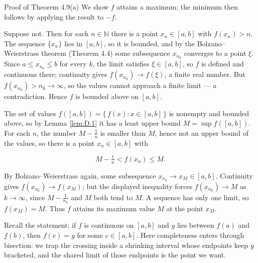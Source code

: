 \documentclass[a4paper,12pt,oneside]{memoir}
\begin{document}
\begin{envproof}{Proof of Theorem 4.9(a)}{}{}
We show \(f\) attains a maximum; the minimum then follows by applying the result to \(-f\).

 Suppose not. Then for each \(n \in \mathbb{N}\) there is a point \(x_{n} \in [a, b]\) with \(f(x_{n}) > n\). The sequence \(\{x_{n}\}\) lies in \([a, b]\), so it is bounded, and by the Bolzano–Weierstrass theorem (Theorem 4.4) some subsequence \(x_{n_{k}}\) converges to a point \(\xi\). Since \(a \le x_{n_{k}} \le b\) for every \(k\), the limit satisfies \(\xi \in [a, b]\), so \(f\) is defined and continuous there; continuity gives \(f(x_{n_{k}}) \to f(\xi)\), a finite real number. But \(f(x_{n_{k}}) > n_{k} \to \infty\), so the values cannot approach a finite limit — a contradiction. Hence \(f\) is bounded above on \([a, b]\).

 The set of values \(f([a, b]) = \{\, f(x) : x \in [a, b] \,\}\) is nonempty and bounded above, so by Lemma \ref{lem:D.1} it has a least upper bound \(M = \sup f([a, b])\). For each \(n\), the number \(M - \tfrac{1}{n}\) is smaller than \(M\), hence not an upper bound of the values, so there is a point \(x_{n} \in [a, b]\) with

\[ M - \tfrac{1}{n} < f(x_{n}) \le M. \]

By Bolzano–Weierstrass again, some subsequence \(x_{n_{k}} \to x_{M} \in [a, b]\). Continuity gives \(f(x_{n_{k}}) \to f(x_{M})\); but the displayed inequality forces \(f(x_{n_{k}}) \to M\) as \(k \to \infty\), since \(M - \tfrac{1}{n_{k}}\) and \(M\) both tend to \(M\). A sequence has only one limit, so \(f(x_{M}) = M\). Thus \(f\) attains its maximum value \(M\) at the point \(x_{M}\). \qedmark
\end{envproof}
Recall the statement: if \(f\) is continuous on \([a, b]\) and \(y\) lies between \(f(a)\) and \(f(b)\), then \(f(c) = y\) for some \(c \in [a, b]\). Here completeness enters through bisection: we trap the crossing inside a shrinking interval whose endpoints keep \(y\) bracketed, and the shared limit of those endpoints is the point we want.
\end{document}
